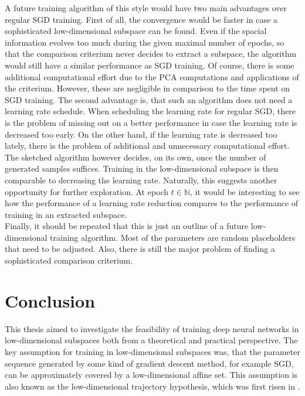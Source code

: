 \documentclass[11pt, a4paper]{article}
\newcommand{\N}{\mathbb{N}}
\begin{document}
A future training algorithm of this style would have two main advantages over regular SGD training. First of all, the convergence would be faster in case a sophisticated low-dimensional subspace can be found. Even if the spacial information evolves too much during the given maximal number of epochs, so that the comparison criterium never decides to extract a subspace, the algorithm would still have a similar performance as SGD training. Of course, there is some additional computational effort due to the PCA computations and applications of the criterium. However, these are negligible in comparison to the time spent on SGD training. The second advantage is, that such an algorithm does not need a learning rate schedule. When scheduling the learning rate for regular SGD, there is the problem of missing out on a better performance in case the learning rate is decreased too early. On the other hand, if the learning rate is decreased too lately, there is the problem of additional and unnecessary computational effort. The sketched algorithm however decides, on its own, once the number of generated samples suffices. Training in the low-dimensional subspace is then comparable to decreasing the learning rate. Naturally, this suggests another opportunity for further exploration. At epoch $t \in \N$, it would be interesting to see how the performance of a learning rate reduction compares to the performance of training in an extracted subspace. \\

Finally, it should be repeated that this is just an outline of a future low-dimensional training algorithm. Most of the parameters are random placeholders that need to be adjusted. Also, there is still the major problem of finding a sophisticated comparison criterium.

\section{Conclusion}

This thesis aimed to investigate the feasibility of training deep neural networks in low-dimensional subspaces both from a theoretical and practical perspective. The key assumption for training in low-dimensional subspaces was, that the parameter sequence generated by some kind of gradient descent method, for example SGD, can be approximately covered by a low-dimensional affine set. This assumption is also known as the low-dimensional trajectory hypothesis, which was first risen in \cite{Paper}. \\
\end{document}

